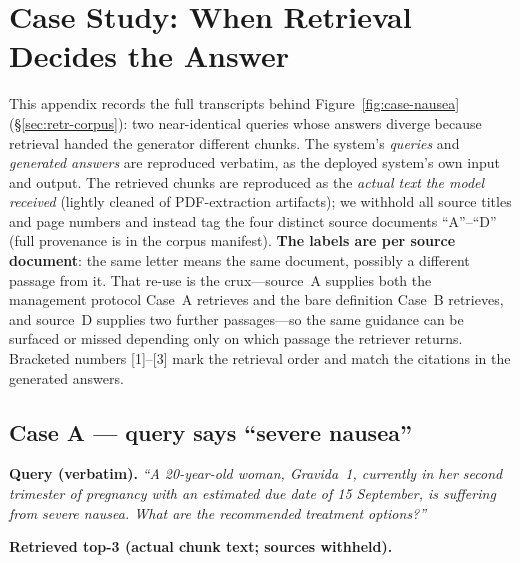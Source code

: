 \section{Case Study: When Retrieval Decides the Answer}
\label{app:case-nausea}
\setlength{\emergencystretch}{2em}

This appendix records the full transcripts behind Figure~\ref{fig:case-nausea}
(\S\ref{sec:retr-corpus}): two near-identical queries whose answers diverge
because retrieval handed the generator different chunks. The system's
\emph{queries} and \emph{generated answers} are reproduced verbatim, as the
deployed system's own input and output. The retrieved chunks are reproduced as
the \emph{actual text the model received} (lightly cleaned of PDF-extraction
artifacts); we withhold all source titles and page numbers and instead tag the
four distinct source documents \mbox{``A''--``D''} (full provenance is in the
corpus manifest). \textbf{The labels are per source document}: the same letter
means the same document, possibly a different passage from it. That re-use is
the crux---source~A supplies both the management protocol Case~A retrieves and
the bare definition Case~B retrieves, and source~D supplies two further
passages---so the same guidance can be surfaced or missed depending only on
which passage the retriever returns. Bracketed numbers \mbox{[1]--[3]} mark the
retrieval order and match the citations in the generated answers.

\subsection*{Case A --- query says ``severe nausea''}

\noindent\textbf{Query (verbatim).} \emph{``A 20-year-old woman, Gravida~1,
currently in her second trimester of pregnancy with an estimated due date of
15 September, is suffering from severe nausea. What are the recommended
treatment options?''}

\smallskip
\noindent\textbf{Retrieved top-3 (actual chunk text; sources withheld).}

